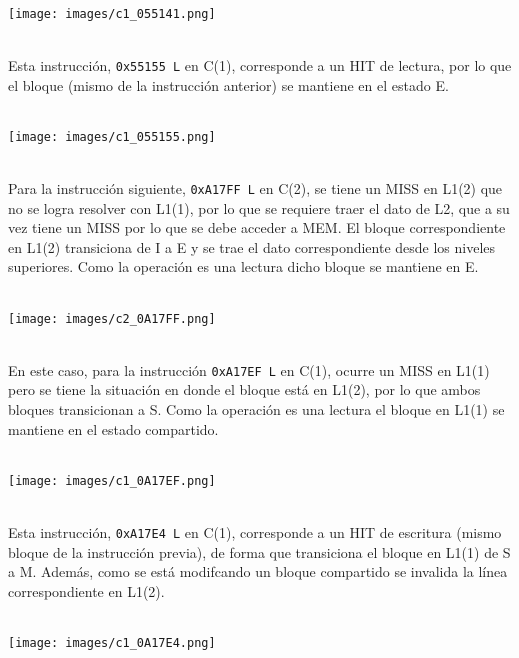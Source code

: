 \documentclass {article}
\begin{document}
\\
\begin{centering} \texttt{[image: images/c1\_055141.png]} \end{centering}
\\
Esta instrucción, \texttt{0x55155 L} en C(1), corresponde a un HIT de lectura, por lo que el bloque
(mismo de la instrucción anterior) se mantiene en el estado E.
\\
\\
\begin{centering} \texttt{[image: images/c1\_055155.png]} \end{centering}
\\
Para la instrucción siguiente, \texttt{0xA17FF L} en C(2), se tiene un MISS en L1(2) que no se logra
resolver con L1(1), por lo que se requiere traer el dato de L2, que a su vez tiene un MISS por lo
que se debe acceder a MEM. El bloque correspondiente en L1(2) transiciona de I a E y se trae el dato
correspondiente desde los niveles superiores. Como la operación es una lectura dicho bloque se
mantiene en E.
\\
\\
\begin{centering} \texttt{[image: images/c2\_0A17FF.png]} \end{centering}
\\
En este caso, para la instrucción \texttt{0xA17EF L} en C(1), ocurre un MISS en L1(1) pero se tiene
la situación en donde el bloque está en L1(2), por lo que ambos bloques transicionan a S. Como la
operación es una lectura el bloque en L1(1) se mantiene en el estado compartido.
\\
\\
\begin{centering} \texttt{[image: images/c1\_0A17EF.png]} \end{centering}
\\
Esta instrucción, \texttt{0xA17E4 L} en C(1), corresponde a un HIT de escritura (mismo bloque de la
instrucción previa), de forma que transiciona el bloque en L1(1) de S a M. Además, como se está
modifcando un bloque compartido se invalida la línea correspondiente en L1(2).
\\
\\
\begin{centering} \texttt{[image: images/c1\_0A17E4.png]} \end{centering}
\\
\end{document}
